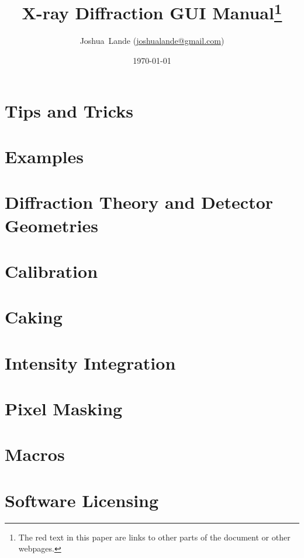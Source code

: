 \documentclass[12pt]{article}
\begin{document}
\title{X-ray Diffraction GUI Manual\footnote{The red text in this paper are links to other parts of the document or other webpages.}}
\date{\today}
\author{Joshua~Lande (\href{mailto:joshualande@gmail.com}{joshualande@gmail.com})}
\maketitle

\tableofcontents

\section{Tips and Tricks}


\section{Examples}


\section{Diffraction Theory and Detector Geometries}


\section{Calibration}
\label{calibration}


\section{Caking}
\label{Caking}


\section{Intensity Integration}


\section{Pixel Masking}


\section{Macros}


\section{Software Licensing}



 

\printindex
\end{document}
